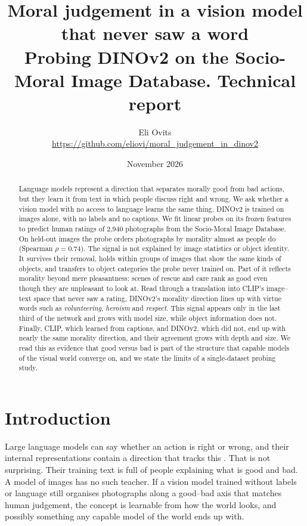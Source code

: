 \documentclass[11pt]{article}
\title{Moral judgement in a vision model that never saw a word\\[4pt]
\large Probing DINOv2 on the Socio-Moral Image Database. Technical report}
\author{Eli Ovits\\ \small\url{https://github.com/eliovi/moral_judgement_in_dinov2}}
\date{November 2026}
\begin{document}
\maketitle

\begin{abstract}
\noindent Language models represent a direction that separates morally good from bad actions, but they learn it from text in which people discuss right and wrong. We ask whether a vision model with no access to language learns the same thing. DINOv2 is trained on images alone, with no labels and no captions. We fit linear probes on its frozen features to predict human ratings of 2,940 photographs from the Socio-Moral Image Database. On held-out images the probe orders photographs by morality almost as people do (Spearman $\rho=0.74$). The signal is not explained by image statistics or object identity. It survives their removal, holds within groups of images that show the same kinds of objects, and transfers to object categories the probe never trained on. Part of it reflects morality beyond mere pleasantness: scenes of rescue and care rank as good even though they are unpleasant to look at. Read through a translation into CLIP's image--text space that never saw a rating, DINOv2's morality direction lines up with virtue words such as \emph{volunteering}, \emph{heroism} and \emph{respect}. This signal appears only in the last third of the network and grows with model size, while object information does not. Finally, CLIP, which learned from captions, and DINOv2, which did not, end up with nearly the same morality direction, and their agreement grows with depth and size. We read this as evidence that good versus bad is part of the structure that capable models of the visual world converge on, and we state the limits of a single-dataset probing study.
\end{abstract}

\section{Introduction}

Large language models can say whether an action is right or wrong, and their internal representations contain a direction that tracks this \cite{schramowski2022,zou2023}. That is not surprising. Their training text is full of people explaining what is good and bad. A model of images has no such teacher. If a vision model trained without labels or language still organises photographs along a good--bad axis that matches human judgement, the concept is learnable from how the world looks, and possibly something any capable model of the world ends up with.
\end{document}
